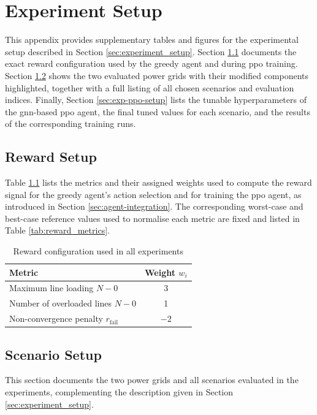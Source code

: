 \chapter{Experiment Setup}\label{ch:exp-setup}
This appendix provides supplementary tables and figures for the experimental setup described in Section \ref{sec:experiment_setup}. Section \ref{sec:exp-reward-setup} documents the exact reward configuration used by the greedy agent and during \ac{ppo} training. Section \ref{sec:exp-scenario-setup} shows the two evaluated power grids with their modified components highlighted, together with a full listing of all chosen scenarios and evaluation indices. Finally, Section \ref{sec:exp-ppo-setup} lists the tunable hyperparameters of the \ac{gnn}-based \ac{ppo} agent, the final tuned values for each scenario, and the results of the corresponding training runs.

\section{Reward Setup}\label{sec:exp-reward-setup}
Table \ref{tab:reward_settings} lists the metrics and their assigned weights used to compute the reward signal for the greedy agent's action selection and for training the \ac{ppo} agent, as introduced in Section \ref{sec:agent-integration}. The corresponding worst-case and best-case reference values used to normalise each metric are fixed and listed in Table \ref{tab:reward_metrics}.

\begin{table}[htbp]
  \centering
  \small
  \caption{Reward configuration used in all experiments}
  \label{tab:reward_settings}
  \begin{tabular}{lc}
    \toprule
    Metric & Weight $w_i$  \\
    \midrule
    Maximum line loading $N\!-\!0$ & 3 \\
    Number of overloaded lines $N\!-\!0$ & 1 \\
    \midrule
    Non-convergence penalty $r_{\mathrm{fail}}$ & $-2$ \\
    \bottomrule
  \end{tabular}
\end{table}

\FloatBarrier










\section{Scenario Setup}\label{sec:exp-scenario-setup}
This section documents the two power grids and all scenarios evaluated in the experiments, complementing the description given in Section \ref{sec:experiment_setup}.

